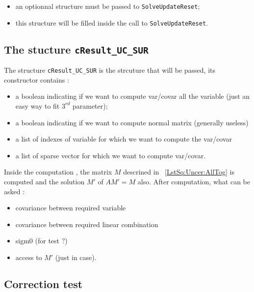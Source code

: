 \begin{itemize}
   \item an optionnal structure must be passed to  {\tt SolveUpdateReset};
   \item this structure  will be filled inside the call to  {\tt SolveUpdateReset}.
\end{itemize}

\subsection{The stucture {\tt cResult\_UC\_SUR}}

The structure {\tt cResult\_UC\_SUR} is the strcuture that will be passed,
its constructor contains :

\begin{itemize}
     \item a boolean indicating if we want to compute var/covar all the variable (just an easy way to fit $3^{rd}$ parameter);
     \item a boolean indicating if we want to compute normal matrix (generally useless)
     \item a list of indexes of variable for which we want to compute the var/covar
     \item a list of sparse vector for which we want to compute var/covar.
\end{itemize}

Inside the computation , the matrix $M$ descrined in ~\ref{LstSq:Uncer:AllTog} is computed
and the solution $M'$ of $AM' = M$ also.  After computation, what can be asked :


\begin{itemize}
      \item covariance between required variable
      \item covariance between required linear combination
      \item sigm0 (for test ?)
      \item access to $M'$ (just in case).
\end{itemize}


\subsection{Correction test}


